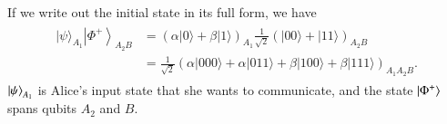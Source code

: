 If we write out the initial state in its full form, we have
\begin{align}
    \begin{aligned}
|\psi\rangle_{A_{1}}\left|\Phi^{+}\right\rangle_{A_{2} B} &=(\alpha|0\rangle+\beta|1\rangle)_{A_{1}} \frac{1}{\sqrt{2}}(|00\rangle+|11\rangle)_{A_{2} B} \\
&=\frac{1}{\sqrt{2}}(\alpha|000\rangle+\alpha|011\rangle+\beta|100\rangle+\beta|111\rangle)_{A_{1} A_{2} B}.
\end{aligned}
\end{align}
$\left| \psi \right\rangle_{A_1}$ is Alice's input state that she wants to communicate, and the state $\left| \Phi^+ \right\rangle$ spans qubits $A_2$ and $B$.

